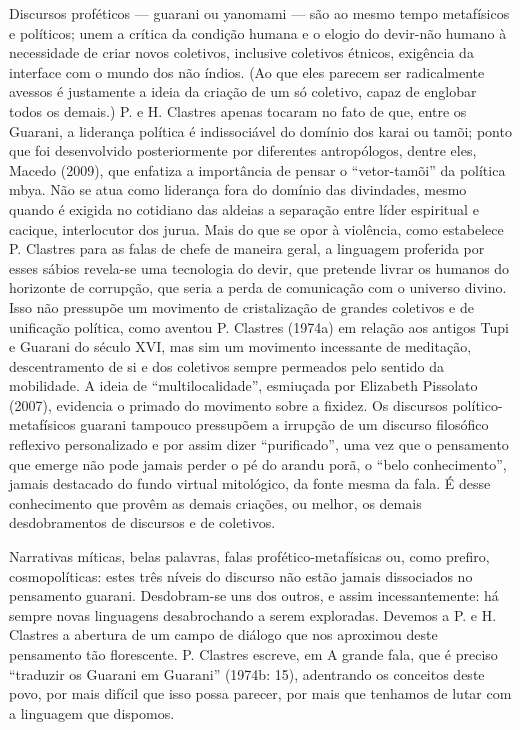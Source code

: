 \documentclass{article}
\begin{document}
Discursos prof\'eticos --- guarani ou yanomami --- s\~ao ao mesmo tempo
metaf\'isicos e pol\'iticos; unem a cr\'itica da condi\c{c}\~ao humana
e o elogio do devir-n\~ao humano \`a necessidade de criar novos
coletivos, inclusive coletivos \'etnicos, exig\^encia da interface com
o mundo dos n\~ao \'indios. (Ao que eles parecem ser radicalmente
avessos \'e justamente a ideia da cria\c{c}\~ao de um s\'o coletivo,
capaz de englobar todos os demais.) P. e H. Clastres apenas tocaram no
fato de que, entre os Guarani, a lideran\c{c}a pol\'itica \'e
indissoci\'avel do dom\'inio dos karai ou tam\~oi; ponto que foi
desenvolvido posteriormente por diferentes antrop\'ologos, dentre eles,
Macedo (2009), que enfatiza a import\^ancia de pensar o
{\textquotedblleft}vetor-tam\~oi{\textquotedblright} da pol\'itica
mbya. N\~ao se atua como lideran\c{c}a fora do dom\'inio das
divindades, mesmo quando \'e exigida no cotidiano das aldeias a
separa\c{c}\~ao entre l\'ider espiritual e cacique, interlocutor dos
jurua. Mais do que se opor \`a viol\^encia, como estabelece P. Clastres
para as falas de chefe de maneira geral, a linguagem proferida por
esses s\'abios revela-se uma tecnologia do devir, que pretende livrar
os humanos do horizonte de corrup\c{c}\~ao, que seria a perda de
comunica\c{c}\~ao com o universo divino. Isso n\~ao pressup\~oe um
movimento de cristaliza\c{c}\~ao de grandes coletivos e de
unifica\c{c}\~ao pol\'itica, como aventou P. Clastres (1974a) em
rela\c{c}\~ao aos antigos Tupi e Guarani do s\'eculo XVI, mas sim um
movimento incessante de medita\c{c}\~ao, descentramento de si e dos
coletivos sempre permeados pelo sentido da mobilidade. A ideia de
{\textquotedblleft}multilocalidade{\textquotedblright}, esmiu\c{c}ada
por Elizabeth Pissolato (2007), evidencia o primado do movimento sobre
a fixidez. Os discursos pol\'itico-metaf\'isicos guarani tampouco
pressup\~oem a irrup\c{c}\~ao de um discurso filos\'ofico reflexivo
personalizado e por assim dizer
{\textquotedblleft}purificado{\textquotedblright}, uma vez que o
pensamento que emerge n\~ao pode jamais perder o p\'e do arandu por\~a,
o {\textquotedblleft}belo conhecimento{\textquotedblright}, jamais
destacado do fundo virtual mitol\'ogico, da fonte mesma da fala. \'E
desse conhecimento que prov\^em as demais cria\c{c}\~oes, ou melhor, os
demais desdobramentos de discursos e de coletivos.

Narrativas m\'iticas, belas palavras, falas prof\'etico-metaf\'isicas
ou, como prefiro, cosmopol\'iticas: estes tr\^es n\'iveis do discurso
n\~ao est\~ao jamais dissociados no pensamento guarani. Desdobram-se
uns dos outros, e assim incessantemente: h\'a sempre novas linguagens
desabrochando a serem exploradas. Devemos a P. e H. Clastres a abertura
de um campo de di\'alogo que nos aproximou deste pensamento t\~ao
florescente. P. Clastres escreve, em A grande fala, que \'e preciso
{\textquotedblleft}traduzir os Guarani em Guarani{\textquotedblright}
(1974b: 15), adentrando os conceitos deste povo, por mais dif\'icil que
isso possa parecer, por mais que tenhamos de lutar com a linguagem que
dispomos. 
\end{document}
